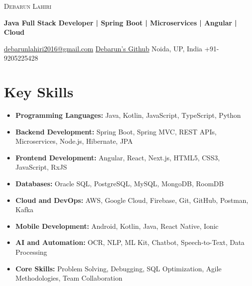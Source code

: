 \documentclass[11pt, a4paper]{article}
\begin{document}
\begin{center}
    {\Huge \scshape Debarun Lahiri}
    \vspace{0.7ex}

    \textbf{Java Full Stack Developer | Spring Boot | Microservices | Angular | Cloud}
    \vspace{0.7ex}

    \href{mailto:debarunlahiri2016@gmail.com}{debarunlahiri2016@gmail.com} \quad\textbar\quad
    \href{https://github.com/debarunlahiri/}{Debarun's Github} \quad\textbar\quad
    Noida, UP, India \quad\textbar\quad
    +91-9205225428
\end{center}

\section*{Key Skills}
\begin{itemize}[leftmargin=*]
    \item \textbf{Programming Languages:} Java, Kotlin, JavaScript, TypeScript, Python
    \item \textbf{Backend Development:} Spring Boot, Spring MVC, REST APIs, Microservices, Node.js, Hibernate, JPA
    \item \textbf{Frontend Development:} Angular, React, Next.js, HTML5, CSS3, JavaScript, RxJS
    \item \textbf{Databases:} Oracle SQL, PostgreSQL, MySQL, MongoDB, RoomDB
    \item \textbf{Cloud and DevOps:} AWS, Google Cloud, Firebase, Git, GitHub, Postman, Kafka
    \item \textbf{Mobile Development:} Android, Kotlin, Java, React Native, Ionic
    \item \textbf{AI and Automation:} OCR, NLP, ML Kit, Chatbot, Speech-to-Text, Data Processing
    \item \textbf{Core Skills:} Problem Solving, Debugging, SQL Optimization, Agile Methodologies, Team Collaboration
\end{itemize}

\end{document}
